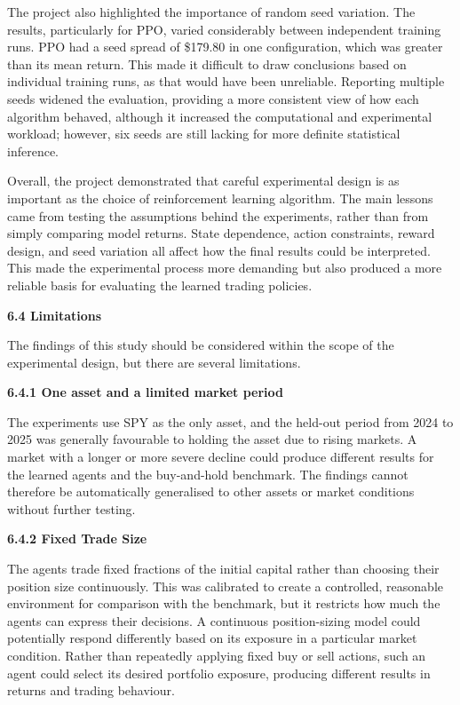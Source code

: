 The project also highlighted the importance of random seed variation.
The results, particularly for PPO, varied considerably between
independent training runs. PPO had a seed spread of \$179.80 in one
configuration, which was greater than its mean return. This made it
difficult to draw conclusions based on individual training runs, as that
would have been unreliable. Reporting multiple seeds widened the
evaluation, providing a more consistent view of how each algorithm
behaved, although it increased the computational and experimental
workload; however, six seeds are still lacking for more definite
statistical inference.

Overall, the project demonstrated that careful experimental design is as
important as the choice of reinforcement learning algorithm. The main
lessons came from testing the assumptions behind the experiments, rather
than from simply comparing model returns. State dependence, action
constraints, reward design, and seed variation all affect how the final
results could be interpreted. This made the experimental process more
demanding but also produced a more reliable basis for evaluating the
learned trading policies.

\textbf{6.4 Limitations}

The findings of this study should be considered within the scope of the
experimental design, but there are several limitations.

\textbf{6.4.1 One asset and a limited market period}

The experiments use SPY as the only asset, and the held-out period from
2024 to 2025 was generally favourable to holding the asset due to rising
markets. A market with a longer or more severe decline could produce
different results for the learned agents and the buy-and-hold benchmark.
The findings cannot therefore be automatically generalised to other
assets or market conditions without further testing.

\textbf{6.4.2 Fixed Trade Size}

The agents trade fixed fractions of the initial capital rather than
choosing their position size continuously. This was calibrated to create
a controlled, reasonable environment for comparison with the benchmark,
but it restricts how much the agents can express their decisions. A
continuous position-sizing model could potentially respond differently
based on its exposure in a particular market condition. Rather than
repeatedly applying fixed buy or sell actions, such an agent could
select its desired portfolio exposure, producing different results in
returns and trading behaviour.

